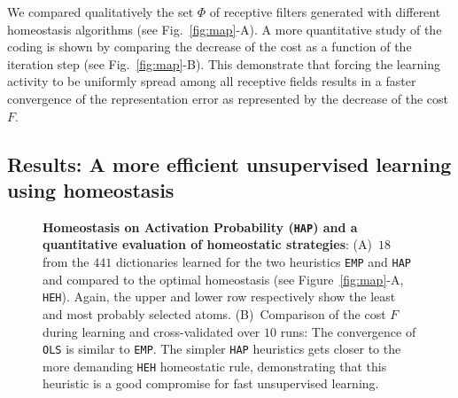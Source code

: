 \documentclass[vision,article,submit,oneauthor,pdftex]{Definitions/mdpi}
\newcommand{\dico}{\Phi} %
\newcommand{\seeFig}[1]{Figure~\ref{fig:#1}}%
\begin{document}
{We compared qualitatively the set $\dico$ of receptive filters generated with different homeostasis algorithms (see Fig.~\ref{fig:map}-A). A more quantitative study of the coding is shown by comparing the decrease of the cost as a function of the iteration step (see Fig.~\ref{fig:map}-B). This demonstrate that forcing the learning activity to be uniformly spread among all receptive fields results in a faster convergence of the representation error as represented by the decrease of the cost $F$. %
\subsection{Results: A more efficient unsupervised learning using homeostasis}\label{results}
\begin{figure}%
\caption{
{\bf Homeostasis on Activation Probability (\texttt{HAP}) and a quantitative evaluation of homeostatic strategies}: %
 {\sf (A)}~$18$ from the $441$ dictionaries learned for the two heuristics \texttt{EMP} and \texttt{HAP} and compared to the optimal homeostasis (see \seeFig{map}-A, \texttt{HEH}).
 Again, the upper and lower row respectively show the least and most probably selected atoms.  {\sf (B)}~Comparison of the cost $F$ during learning and cross-validated over $10$ runs: The convergence of \texttt{OLS} is similar to \texttt{EMP}. The simpler \texttt{HAP} heuristics gets closer to the more demanding \texttt{HEH} homeostatic rule, demonstrating that this heuristic is a good compromise for fast unsupervised learning.
}
\end{figure}}
\end{document}
